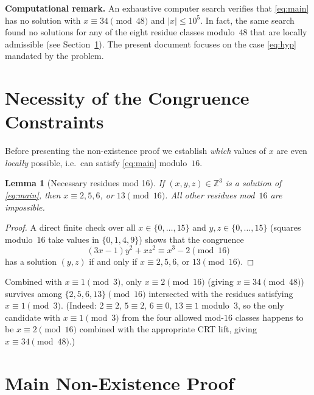 \documentclass[12pt,a4paper]{article}
\newtheorem{lemma}[theorem]{Lemma}
\begin{document}
\textbf{Computational remark.} An exhaustive computer search verifies that
\eqref{eq:main} has no solution with $x \equiv 34 \pmod{48}$ and
$|x| \leq 10^5$. In fact, the same search found no solutions for any of the
eight residue classes modulo~$48$ that are locally admissible (see
Section~\ref{sec:necessity}). The present document focuses on the case
\eqref{eq:hyp} mandated by the problem.

\section{Necessity of the Congruence Constraints}
\label{sec:necessity}

Before presenting the non-existence proof we establish \emph{which} values
of $x$ are even \emph{locally} possible, i.e.\ can satisfy \eqref{eq:main}
modulo~$16$.

\begin{lemma}[Necessary residues mod 16]\label{lem:mod16}
If $(x,y,z)\in\mathbb{Z}^3$ is a solution of \eqref{eq:main}, then
$x \equiv 2, 5, 6$, or $13 \pmod{16}$.
All other residues mod~$16$ are impossible.
\end{lemma}

\begin{proof}
A direct finite check over all $x \in \{0,\ldots,15\}$ and $y,z \in
\{0,\ldots,15\}$ (squares modulo~$16$ take values in $\{0,1,4,9\}$) shows
that the congruence
\[
  (3x-1)y^2 + xz^2 \equiv x^3-2 \pmod{16}
\]
has a solution $(y,z)$ if and only if $x \equiv 2, 5, 6$, or $13
\pmod{16}$.
\end{proof}

Combined with $x \equiv 1 \pmod 3$, only $x\equiv 2 \pmod{16}$
(giving $x\equiv34\pmod{48}$) survives among $\{2,5,6,13\}\pmod{16}$
intersected with the residues satisfying $x\equiv 1\pmod 3$.
(Indeed: $2\equiv2$, $5\equiv2$, $6\equiv0$, $13\equiv1$ modulo~$3$, so the
only candidate with $x\equiv1\pmod3$ from the four allowed mod-$16$ classes
happens to be $x\equiv2\pmod{16}$ combined with the appropriate CRT lift,
giving $x\equiv34\pmod{48}$.)

\section{Main Non-Existence Proof}
\label{sec:proof}
\end{document}
